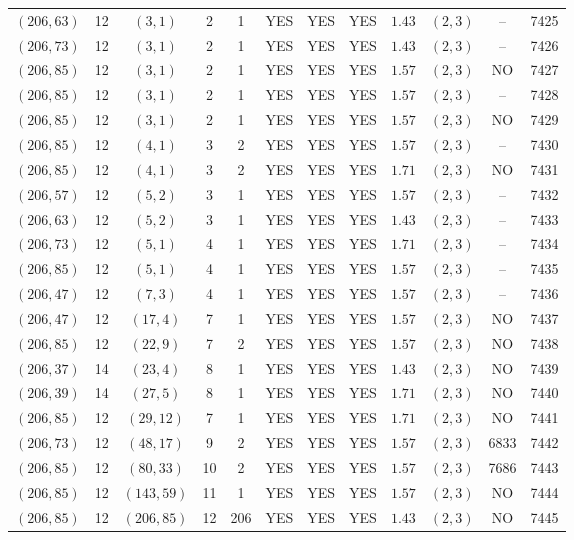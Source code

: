 \begin{longtable}{|c|c|c|c|c|c|c|c|c|c|c|c|}
$(206,63)$ & 12 & $(3,1)$ & 2 & 1 & YES & YES & YES & $1.43$ & $(2,3)$ & -- & 7425\\
$(206,73)$ & 12 & $(3,1)$ & 2 & 1 & YES & YES & YES & $1.43$ & $(2,3)$ & -- & 7426\\
$(206,85)$ & 12 & $(3,1)$ & 2 & 1 & YES & YES & YES & $1.57$ & $(2,3)$ & NO & 7427\\
$(206,85)$ & 12 & $(3,1)$ & 2 & 1 & YES & YES & YES & $1.57$ & $(2,3)$ & -- & 7428\\
$(206,85)$ & 12 & $(3,1)$ & 2 & 1 & YES & YES & YES & $1.57$ & $(2,3)$ & NO & 7429\\
$(206,85)$ & 12 & $(4,1)$ & 3 & 2 & YES & YES & YES & $1.57$ & $(2,3)$ & -- & 7430\\
$(206,85)$ & 12 & $(4,1)$ & 3 & 2 & YES & YES & YES & $1.71$ & $(2,3)$ & NO & 7431\\
$(206,57)$ & 12 & $(5,2)$ & 3 & 1 & YES & YES & YES & $1.57$ & $(2,3)$ & -- & 7432\\
$(206,63)$ & 12 & $(5,2)$ & 3 & 1 & YES & YES & YES & $1.43$ & $(2,3)$ & -- & 7433\\
$(206,73)$ & 12 & $(5,1)$ & 4 & 1 & YES & YES & YES & $1.71$ & $(2,3)$ & -- & 7434\\
$(206,85)$ & 12 & $(5,1)$ & 4 & 1 & YES & YES & YES & $1.57$ & $(2,3)$ & -- & 7435\\
$(206,47)$ & 12 & $(7,3)$ & 4 & 1 & YES & YES & YES & $1.57$ & $(2,3)$ & -- & 7436\\
$(206,47)$ & 12 & $(17,4)$ & 7 & 1 & YES & YES & YES & $1.57$ & $(2,3)$ & NO & 7437\\
$(206,85)$ & 12 & $(22,9)$ & 7 & 2 & YES & YES & YES & $1.57$ & $(2,3)$ & NO & 7438\\
$(206,37)$ & 14 & $(23,4)$ & 8 & 1 & YES & YES & YES & $1.43$ & $(2,3)$ & NO & 7439\\
$(206,39)$ & 14 & $(27,5)$ & 8 & 1 & YES & YES & YES & $1.71$ & $(2,3)$ & NO & 7440\\
$(206,85)$ & 12 & $(29,12)$ & 7 & 1 & YES & YES & YES & $1.71$ & $(2,3)$ & NO & 7441\\
$(206,73)$ & 12 & $(48,17)$ & 9 & 2 & YES & YES & YES & $1.57$ & $(2,3)$ & 6833 & 7442\\
$(206,85)$ & 12 & $(80,33)$ & 10 & 2 & YES & YES & YES & $1.57$ & $(2,3)$ & 7686 & 7443\\
$(206,85)$ & 12 & $(143,59)$ & 11 & 1 & YES & YES & YES & $1.57$ & $(2,3)$ & NO & 7444\\
$(206,85)$ & 12 & $(206,85)$ & 12 & 206 & YES & YES & YES & $1.43$ & $(2,3)$ & NO & 7445\\

\end{longtable}
